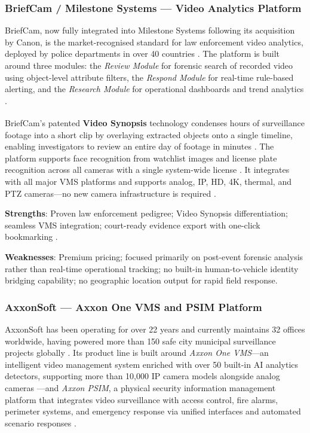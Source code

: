 \subsubsection{BriefCam / Milestone Systems — Video Analytics Platform}

BriefCam, now fully integrated into Milestone Systems following its acquisition by Canon, is the market-recognised standard for law enforcement video analytics, deployed by police departments in over 40 countries \cite{briefcam_policing, milestone_briefcam}. The platform is built around three modules: the \textit{Review Module} for forensic search of recorded video using object-level attribute filters, the \textit{Respond Module} for real-time rule-based alerting, and the \textit{Research Module} for operational dashboards and trend analytics \cite{briefcam_milestone_tour, milestone_briefcam}.

BriefCam's patented \textbf{Video Synopsis\textsuperscript{\textregistered}} technology condenses hours of surveillance footage into a short clip by overlaying extracted objects onto a single timeline, enabling investigators to review an entire day of footage in minutes \cite{milestone_briefcam, briefcam_policing}. The platform supports face recognition from watchlist images and license plate recognition across all cameras with a single system-wide license \cite{milestone_briefcam}. It integrates with all major VMS platforms and supports analog, IP, HD, 4K, thermal, and PTZ cameras—no new camera infrastructure is required \cite{briefcam_policing}.

\textbf{Strengths}: Proven law enforcement pedigree; Video Synopsis differentiation; seamless VMS integration; court-ready evidence export with one-click bookmarking \cite{briefcam_policing, milestone_briefcam}.

\textbf{Weaknesses}: Premium pricing; focused primarily on post-event forensic analysis rather than real-time operational tracking; no built-in human-to-vehicle identity bridging capability; no geographic location output for rapid field response.

\subsubsection{AxxonSoft — Axxon One VMS and PSIM Platform}

AxxonSoft has been operating for over 22 years and currently maintains 32 offices worldwide, having powered more than 150 safe city municipal surveillance projects globally \cite{axxonsoft_website}. Its product line is built around \textit{Axxon One VMS}—an intelligent video management system enriched with over 50 built-in AI analytics detectors, supporting more than 10,000 IP camera models alongside analog cameras \cite{axxonsoft_website}—and \textit{Axxon PSIM}, a physical security information management platform that integrates video surveillance with access control, fire alarms, perimeter systems, and emergency response via unified interfaces and automated scenario responses \cite{axxonsoft_website}.

